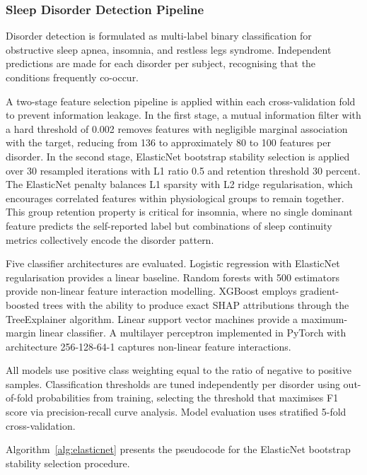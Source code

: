 \subsubsection{Sleep Disorder Detection Pipeline}

Disorder detection is formulated as multi-label binary classification for obstructive sleep apnea, insomnia, and restless legs syndrome. Independent predictions are made for each disorder per subject, recognising that the conditions frequently co-occur.

A two-stage feature selection pipeline is applied within each cross-validation fold to prevent information leakage. In the first stage, a mutual information filter with a hard threshold of 0.002 removes features with negligible marginal association with the target, reducing from 136 to approximately 80 to 100 features per disorder. In the second stage, ElasticNet bootstrap stability selection \cite{meinshausen2010stability, zou2005elasticnet} is applied over 30 resampled iterations with L1 ratio 0.5 and retention threshold 30 percent. The ElasticNet penalty balances L1 sparsity with L2 ridge regularisation, which encourages correlated features within physiological groups to remain together. This group retention property is critical for insomnia, where no single dominant feature predicts the self-reported label but combinations of sleep continuity metrics collectively encode the disorder pattern.

Five classifier architectures are evaluated. Logistic regression with ElasticNet regularisation provides a linear baseline. Random forests with 500 estimators provide non-linear feature interaction modelling. XGBoost \cite{chen2016xgboost} employs gradient-boosted trees with the ability to produce exact SHAP attributions through the TreeExplainer algorithm. Linear support vector machines provide a maximum-margin linear classifier. A multilayer perceptron implemented in PyTorch with architecture 256-128-64-1 captures non-linear feature interactions.

All models use positive class weighting equal to the ratio of negative to positive samples. Classification thresholds are tuned independently per disorder using out-of-fold probabilities from training, selecting the threshold that maximises F1 score via precision-recall curve analysis. Model evaluation uses stratified 5-fold cross-validation.

Algorithm~\ref{alg:elasticnet} presents the pseudocode for the ElasticNet bootstrap stability selection procedure.

